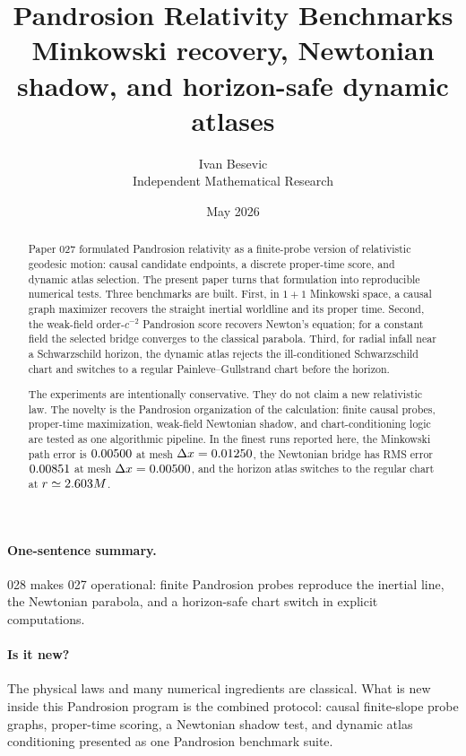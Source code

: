 \documentclass[11pt]{article}
\title{Pandrosion Relativity Benchmarks\\[3pt]
\large Minkowski recovery, Newtonian shadow, and horizon-safe dynamic atlases}
\author{Ivan Besevic\\Independent Mathematical Research}
\date{May 2026}
\begin{document}
\maketitle

\begin{abstract}
Paper 027 formulated Pandrosion relativity as a finite-probe version of
relativistic geodesic motion: causal candidate endpoints, a discrete
proper-time score, and dynamic atlas selection.  The present paper turns that
formulation into reproducible numerical tests.  Three benchmarks are built.
First, in \(1+1\) Minkowski space, a causal graph maximizer recovers the
straight inertial worldline and its proper time.  Second, the weak-field
order-\(c^{-2}\) Pandrosion score recovers Newton's equation; for a constant
field the selected bridge converges to the classical parabola.  Third, for
radial infall near a Schwarzschild horizon, the dynamic atlas rejects the
ill-conditioned Schwarzschild chart and switches to a regular
Painleve--Gullstrand chart before the horizon.

The experiments are intentionally conservative.  They do not claim a new
relativistic law.  The novelty is the Pandrosion organization of the
calculation: finite causal probes, proper-time maximization, weak-field
Newtonian shadow, and chart-conditioning logic are tested as one algorithmic
pipeline.  In the finest runs reported here, the Minkowski path error is
\(0.00500\) at mesh \(\Delta x=0.01250\), the Newtonian bridge
has RMS error \(0.00851\) at mesh \(\Delta x=0.00500\), and
the horizon atlas switches to the regular chart at
\(r\simeq 2.603 M\).
\end{abstract}

\paragraph{One-sentence summary.}
028 makes 027 operational: finite Pandrosion probes reproduce the inertial
line, the Newtonian parabola, and a horizon-safe chart switch in explicit
computations.

\paragraph{Is it new?}
The physical laws and many numerical ingredients are classical.  What is new
inside this Pandrosion program is the combined protocol: causal finite-slope
probe graphs, proper-time scoring, a Newtonian shadow test, and dynamic atlas
conditioning presented as one Pandrosion benchmark suite.
\end{document}
